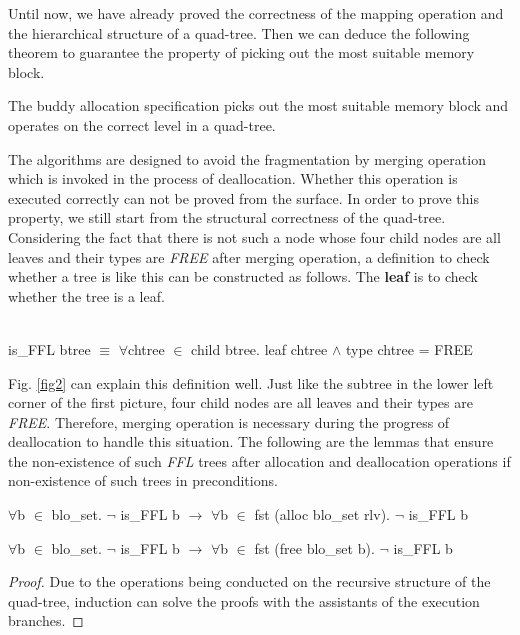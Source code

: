 \documentclass[runningheads]{llncs}
\begin{document}
Until now, we have already proved the correctness of the mapping operation and the hierarchical structure of a quad-tree. Then we can deduce the following theorem to guarantee the property of picking out the most suitable memory block.

\begin{theorem}
The buddy allocation specification picks out the most suitable memory block and operates on the correct level in a quad-tree.
\end{theorem}

The algorithms are designed to avoid the fragmentation by merging operation which is invoked in the process of deallocation. Whether this operation is executed correctly can not be proved from the surface. In order to prove this property, we still start from the structural correctness of the quad-tree. Considering the fact that there is not such a node whose four child nodes are all leaves and their types are \emph{FREE} after merging operation, a definition to check whether a tree is like this can be constructed as follows. The \textbf{leaf} is to check whether the tree is a leaf.

\begin{definition}  \\
is\_FFL btree $\equiv$ $\forall$chtree $\in$ child btree. leaf chtree $\wedge$ type chtree = FREE
\end{definition}

Fig. \ref{fig2} can explain this definition well. Just like the subtree in the lower left corner of the first picture, four child nodes are all leaves and their types are \emph{FREE}. Therefore, merging operation is necessary during the progress of deallocation to handle this situation. The following are the lemmas that ensure the non-existence of such \emph{FFL} trees after allocation and deallocation operations if non-existence of such trees in preconditions.

\begin{lemma}
$\forall$b $\in$ blo\_set. $\neg$ is\_FFL b $\longrightarrow$ $\forall$b $\in$ fst (alloc blo\_set rlv). $\neg$ is\_FFL b
\end{lemma}

\begin{lemma}
$\forall$b $\in$ blo\_set. $\neg$ is\_FFL b $\longrightarrow$ $\forall$b $\in$ fst (free blo\_set b). $\neg$ is\_FFL b
\end{lemma}

\begin{proof}
Due to the operations being conducted on the recursive structure of the quad-tree, induction can solve the proofs with the assistants of the execution branches.
\end{proof}
\end{document}
